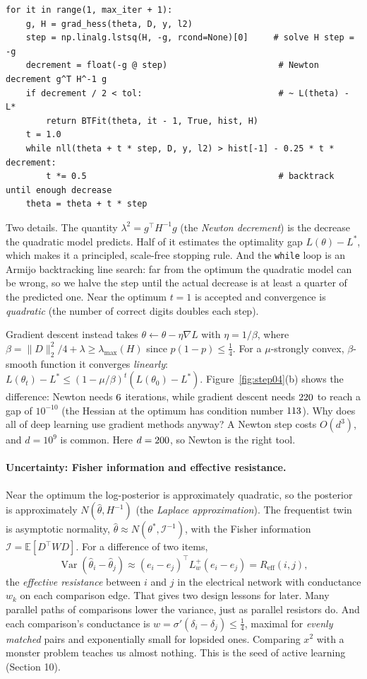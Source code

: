 \documentclass[11pt]{article}
\theoremstyle{definition}
\theoremstyle{plain}
\theoremstyle{remark}
\newcommand{\E}{\mathbb{E}}
\newcommand{\code}[1]{\texttt{#1}}
\renewcommand{\_}{\oldunderscore\allowbreak}
\newcommand{\file}[1]{\textcolor{blue!50!black}{\texttt{#1}}}
\DeclareMathOperator{\Var}{Var}
\newcommand{\codefrom}[1]{\par\smallskip\noindent{\footnotesize\textbf{From} \file{#1}}}
\begin{document}
\codefrom{src/calcdiff/models/bt.py}
\begin{lstlisting}
for it in range(1, max_iter + 1):
    g, H = grad_hess(theta, D, y, l2)
    step = np.linalg.lstsq(H, -g, rcond=None)[0]     # solve H step = -g
    decrement = float(-g @ step)                      # Newton decrement g^T H^-1 g
    if decrement / 2 < tol:                           # ~ L(theta) - L*
        return BTFit(theta, it - 1, True, hist, H)
    t = 1.0
    while nll(theta + t * step, D, y, l2) > hist[-1] - 0.25 * t * decrement:
        t *= 0.5                                      # backtrack until enough decrease
    theta = theta + t * step
\end{lstlisting}
Two details. The quantity $\lambda^2=g^\top H^{-1}g$ (the \emph{Newton decrement}) is the decrease the quadratic model predicts.
Half of it estimates the optimality gap $L(\theta)-L^\ast$, which makes it a principled, scale-free stopping rule. And
the \code{while} loop is an Armijo backtracking line search: far from the optimum the quadratic model can be wrong, so we halve
the step until the actual decrease is at least a quarter of the predicted one. Near the optimum $t=1$ is accepted
and convergence is \emph{quadratic} (the number of correct digits doubles each step).

Gradient descent instead takes $\theta\leftarrow\theta-\eta\nabla L$ with $\eta=1/\beta$, where
$\beta=\|D\|_2^2/4+\lambda\ge\lambda_{\max}(H)$ since $p(1-p)\le\frac14$. For a $\mu$-strongly convex, $\beta$-smooth function it
converges \emph{linearly}: $L(\theta_t)-L^\ast\le(1-\mu/\beta)^t(L(\theta_0)-L^\ast)$. Figure~\ref{fig:step04}(b) shows
the difference: Newton needs $6$ iterations, while gradient descent needs $220$ to reach a gap of $10^{-10}$
(the Hessian at the optimum has condition number $113$). Why does all of deep learning use gradient methods anyway? A Newton step
costs $O(d^3)$, and $d=10^9$ is common. Here $d=200$, so Newton is the right tool.

\paragraph{Uncertainty: Fisher information and effective resistance.}
Near the optimum the log-posterior is approximately quadratic, so the posterior is approximately
$N(\hat\theta,H^{-1})$ (the \emph{Laplace approximation}). The frequentist twin is asymptotic normality,
$\hat\theta\approx N(\theta^\ast,\mathcal I^{-1})$, with the Fisher information $\mathcal I=\E[D^\top WD]$. For a difference of two items,
\[
  \Var(\hat\theta_i-\hat\theta_j)\approx(e_i-e_j)^\top L_w^{+}(e_i-e_j)=R_{\mathrm{eff}}(i,j),
\]
the \emph{effective resistance} between $i$ and $j$ in the electrical network with conductance $w_k$ on each comparison edge.
That gives two design lessons for later. Many parallel paths of comparisons lower the variance, just as parallel resistors do. And each comparison's
conductance is $w=\sigma'(\delta_i-\delta_j)\le\frac14$, maximal for \emph{evenly matched} pairs and exponentially small for
lopsided ones. Comparing $x^2$ with a monster problem teaches us almost nothing. This is the seed of active learning (Section 10).
\end{document}
